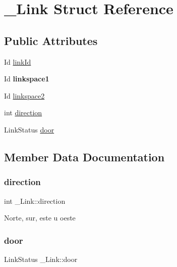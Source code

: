 \hypertarget{struct__Link}{}\section{\+\_\+\+Link Struct Reference}
\label{struct__Link}
\subsection*{Public Attributes}
\begin{DoxyCompactItemize}
\item 
Id \hyperlink{struct__Link_a3c2eb94d5f272bf373c113a868e3d367}{link\+Id}
\item 
\mbox{\label{struct__Link_a851b2cb675c25aaa73ebbaa58b8db1a2}} 
Id {\bfseries linkspace1}
\item 
Id \hyperlink{struct__Link_aac79e76abc5512cd08a381eb835d59f0}{linkspace2}
\item 
int \hyperlink{struct__Link_a112e92df8f8eae3055ab45793ed4a660}{direction}
\item 
Link\+Status \hyperlink{struct__Link_ab4d6f65f126e9a41440828d2317b7a79}{door}
\end{DoxyCompactItemize}


\subsection{Member Data Documentation}
\mbox{\label{struct__Link_a112e92df8f8eae3055ab45793ed4a660}} 
\subsubsection{\texorpdfstring{direction}{direction}}
{\footnotesize\ttfamily int \+\_\+\+Link\+::direction}

Norte, sur, este u oeste \mbox{\label{struct__Link_ab4d6f65f126e9a41440828d2317b7a79}} 
\subsubsection{\texorpdfstring{door}{door}}
{\footnotesize\ttfamily Link\+Status \+\_\+\+Link\+::door}

